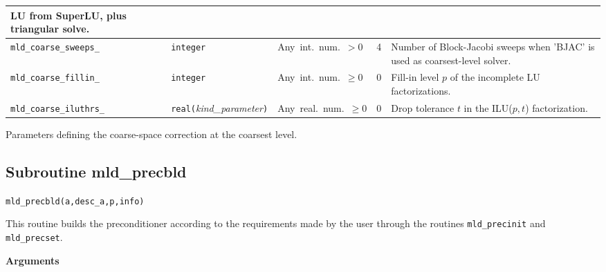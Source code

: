 \begin{center}
\begin{tabular}{|l|l|p{3.2cm}|l|p{7cm}|}
                           LU from SuperLU, plus triangular solve. \\ \hline
\verb|mld_coarse_sweeps_|& \verb|integer|                         
                         & Any~int.~num.~$> 0$
                         & 4
                         & Number of Block-Jacobi sweeps when 'BJAC' is used as
                           coarsest-level solver. \\ \hline
\verb|mld_coarse_fillin_| & \verb|integer|
                         & Any~int.~num.~$\ge 0$
                         & 0
                         & Fill-in level $p$ of the incomplete LU factorizations. \\ \hline
\verb|mld_coarse_iluthrs_| & \verb|real(|\emph{kind\_parameter}\verb|)|
                         & Any~real.~num.~$\ge 0$
                         & 0
                         & Drop tolerance $t$ in the ILU($p,t$) factorization. \\
\hline
\end{tabular}
\end{center}
\caption{Parameters defining the coarse-space correction at the coarsest
level.\label{tab:p_coarse}} 
\esideways


\clearpage

\subsection{Subroutine mld\_precbld\label{sec:precbld}}

\begin{center}
\verb|mld_precbld(a,desc_a,p,info)|\\
\end{center}

\noindent
This routine builds the preconditioner according to the requirements made by
the user through the routines \verb|mld_precinit| and \verb|mld_precset|.

{\baselineskip\noindent\large\bfseries Arguments}

